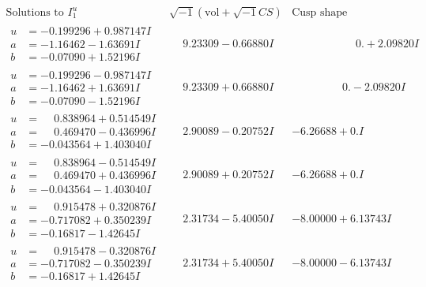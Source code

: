 \documentclass[1p]{elsarticle_modified}
\theoremstyle{definition}
\newcommand{\I}{\sqrt{-1}}
\begin{document}
$$\begin{array}{c|c|c}  
\text{Solutions to }I^u_{1}& \I (\text{vol} + \sqrt{-1}CS) & \text{Cusp shape}\\
 \hline 
\begin{aligned}
u &= -0.199296 + 0.987147 I \\
a &= -1.16462 - 1.63691 I \\
b &= -0.07090 + 1.52196 I\end{aligned}
 & \phantom{-}9.23309 - 0.66880 I & \phantom{-0.000000 -}0. + 2.09820 I \\ \hline\begin{aligned}
u &= -0.199296 - 0.987147 I \\
a &= -1.16462 + 1.63691 I \\
b &= -0.07090 - 1.52196 I\end{aligned}
 & \phantom{-}9.23309 + 0.66880 I & \phantom{-0.000000 } 0. - 2.09820 I \\ \hline\begin{aligned}
u &= \phantom{-}0.838964 + 0.514549 I \\
a &= \phantom{-}0.469470 - 0.436996 I \\
b &= -0.043564 + 1.403040 I\end{aligned}
 & \phantom{-}2.90089 - 0.20752 I & -6.26688 + 0. I\phantom{ +0.000000I} \\ \hline\begin{aligned}
u &= \phantom{-}0.838964 - 0.514549 I \\
a &= \phantom{-}0.469470 + 0.436996 I \\
b &= -0.043564 - 1.403040 I\end{aligned}
 & \phantom{-}2.90089 + 0.20752 I & -6.26688 + 0. I\phantom{ +0.000000I} \\ \hline\begin{aligned}
u &= \phantom{-}0.915478 + 0.320876 I \\
a &= -0.717082 + 0.350239 I \\
b &= -0.16817 - 1.42645 I\end{aligned}
 & \phantom{-}2.31734 - 5.40050 I & -8.00000 + 6.13743 I \\ \hline\begin{aligned}
u &= \phantom{-}0.915478 - 0.320876 I \\
a &= -0.717082 - 0.350239 I \\
b &= -0.16817 + 1.42645 I\end{aligned}
 & \phantom{-}2.31734 + 5.40050 I & -8.00000 - 6.13743 I \\ \hline\begin{aligned}

\end{aligned}
\end{array}$$
\end{document}
